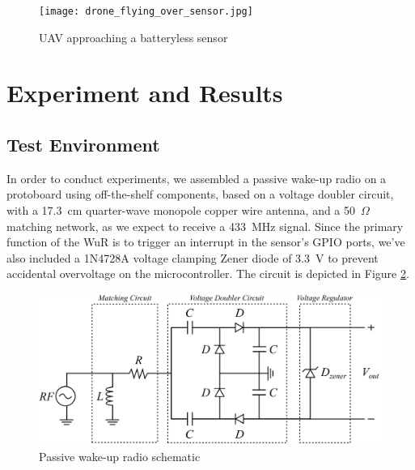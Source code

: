 \documentclass[conference]{IEEEtran}
\begin{document}



\begin{figure}[htbp]
  \centerline{\texttt{[image: drone\_flying\_over\_sensor.jpg]}}
  \caption{UAV approaching a batteryless sensor}
  \label{fig:drone_over_sensor}
\end{figure}

\section{Experiment and Results}

\subsection{Test Environment}

In order to conduct experiments, we assembled a passive wake-up radio on a protoboard using off-the-shelf components, based on a voltage doubler circuit, with a 17.3~cm quarter-wave monopole copper wire antenna, and a 50~$\Omega$ matching network, as we expect to receive a 433~MHz signal. Since the primary function of the WuR is to trigger an interrupt in the sensor's GPIO ports, we've also included a 1N4728A voltage clamping Zener diode of 3.3~V to prevent accidental overvoltage on the microcontroller. The circuit is depicted in Figure \ref{fig:receiver}.

\begin{figure}[htbp]
  \centerline{\includegraphics[width=1\linewidth]{receiver.png}}
  \caption{Passive wake-up radio schematic}
  \label{fig:receiver}
\end{figure}
\end{document}
